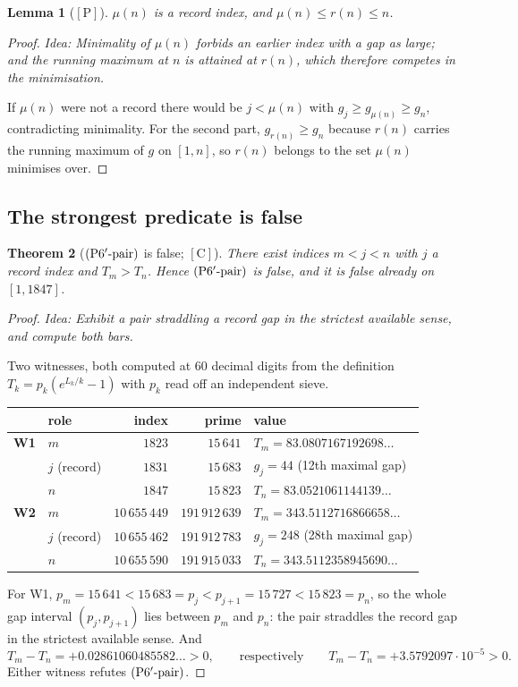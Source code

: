 \documentclass[11pt,a4paper]{article}
\theoremstyle{plain}
\newtheorem{theorem}{Theorem}[section]
\newtheorem{lemma}[theorem]{Lemma}
\theoremstyle{definition}
\theoremstyle{remark}
\newcommand{\idea}[1]{\emph{Idea: #1}\par\smallskip}
\newcommand{\cP}{{[\mathrm{P}]}}
\newcommand{\cC}{{[\mathrm{C}]}}
\newcommand{\Ppair}{\textup{(P6$'$-pair)}}
\begin{document}
\begin{lemma}[$\cP$]
\label{lem:fact0}
$\mu(n)$ is a record index, and $\mu(n) \le r(n) \le n$.
\end{lemma}

\begin{proof}
\idea{Minimality of $\mu(n)$ forbids an earlier index with a gap as large; and the running
maximum at $n$ is attained at $r(n)$, which therefore competes in the minimisation.}
If $\mu(n)$ were not a record there would be $j < \mu(n)$ with $g_j \ge g_{\mu(n)} \ge g_n$,
contradicting minimality. For the second part, $g_{r(n)} \ge g_n$ because $r(n)$ carries the
running maximum of $g$ on $[1,n]$, so $r(n)$ belongs to the set $\mu(n)$ minimises over.
\end{proof}

\subsection{The strongest predicate is false}

\begin{theorem}[$\Ppair$ is false; $\cC$]
\label{thm:pairfalse}
There exist indices $m < j < n$ with $j$ a record index and $T_m > T_n$. Hence $\Ppair$ is
false, and it is false already on $[1, 1847]$.
\end{theorem}

\begin{proof}
\idea{Exhibit a pair straddling a record gap in the strictest available sense, and compute
both bars.}
Two witnesses, both computed at 60 decimal digits from the definition
$T_k = p_k(e^{L_k/k}-1)$ with $p_k$ read off an independent sieve.

\begin{center}
\begin{tabular}{@{}llrrl@{}}
\toprule
 & role & index & prime & value \\
\midrule
\textbf{W1} & $m$          & $1823$ & $15\,641$ & $T_m = 83.0807167192698\ldots$ \\
            & $j$ (record) & $1831$ & $15\,683$ & $g_j = 44$ (12th maximal gap) \\
            & $n$          & $1847$ & $15\,823$ & $T_n = 83.0521061144139\ldots$ \\
\midrule
\textbf{W2} & $m$          & $10\,655\,449$ & $191\,912\,639$ & $T_m = 343.5112716866658\ldots$ \\
            & $j$ (record) & $10\,655\,462$ & $191\,912\,783$ & $g_j = 248$ (28th maximal gap) \\
            & $n$          & $10\,655\,590$ & $191\,915\,033$ & $T_n = 343.5112358945690\ldots$ \\
\bottomrule
\end{tabular}
\end{center}

For W1, $p_m = 15\,641 < 15\,683 = p_j < p_{j+1} = 15\,727 < 15\,823 = p_n$, so the whole gap
interval $(p_j, p_{j+1})$ lies between $p_m$ and $p_n$: the pair straddles the record gap in
the strictest available sense. And
\[
T_m - T_n = +0.02861060485582\ldots > 0 ,
\qquad\text{respectively}\qquad
T_m - T_n = +3.5792097\cdot10^{-5} > 0 .
\]
Either witness refutes $\Ppair$.
\end{proof}
\end{document}
